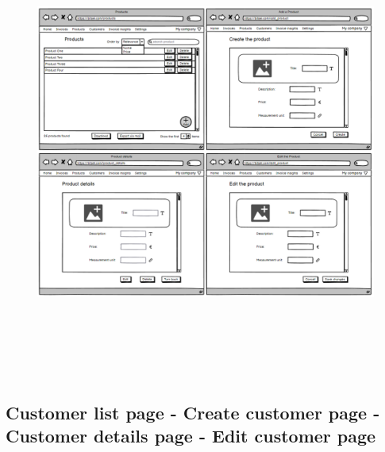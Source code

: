 \begin{figure}[h!]
    \centering
    \includegraphics[height=420pt, keepaspectratio]{resources/mockup/Product.png}
\end{figure}
\newpage

\subsection{Customer list page - Create customer page - Customer details page - Edit customer page}

